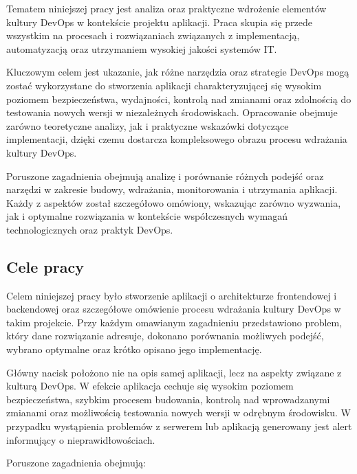 \documentclass{article}
\begin{document}
Tematem niniejszej pracy jest analiza oraz praktyczne wdrożenie elementów kultury DevOps w kontekście projektu aplikacji. Praca skupia się przede wszystkim na procesach i rozwiązaniach związanych z implementacją, automatyzacją oraz utrzymaniem wysokiej jakości systemów IT. 

Kluczowym celem jest ukazanie, jak różne narzędzia oraz strategie DevOps mogą zostać wykorzystane do stworzenia aplikacji charakteryzującej się wysokim poziomem bezpieczeństwa, wydajności, kontrolą nad zmianami oraz zdolnością do testowania nowych wersji w niezależnych środowiskach. Opracowanie obejmuje zarówno teoretyczne analizy, jak i praktyczne wskazówki dotyczące implementacji, dzięki czemu dostarcza kompleksowego obrazu procesu wdrażania kultury DevOps.

Poruszone zagadnienia obejmują analizę i porównanie różnych podejść oraz narzędzi w zakresie budowy, wdrażania, monitorowania i utrzymania aplikacji. Każdy z aspektów został szczegółowo omówiony, wskazując zarówno wyzwania, jak i optymalne rozwiązania w kontekście współczesnych wymagań technologicznych oraz praktyk DevOps.

\subsection{Cele pracy}

Celem niniejszej pracy było stworzenie aplikacji o architekturze frontendowej i backendowej oraz szczegółowe omówienie procesu wdrażania kultury DevOps w takim projekcie. Przy każdym omawianym zagadnieniu przedstawiono problem, który dane rozwiązanie adresuje, dokonano porównania możliwych podejść, wybrano optymalne oraz krótko opisano jego implementację.

Główny nacisk położono nie na opis samej aplikacji, lecz na aspekty związane z kulturą DevOps. W efekcie aplikacja cechuje się wysokim poziomem bezpieczeństwa, szybkim procesem budowania, kontrolą nad wprowadzanymi zmianami oraz możliwością testowania nowych wersji w odrębnym środowisku. W przypadku wystąpienia problemów z serwerem lub aplikacją generowany jest alert informujący o nieprawidłowościach.

Poruszone zagadnienia obejmują:
\end{document}
